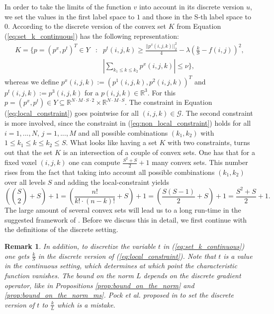 \documentclass[abstracton]{scrreprt}
\newtheorem{remark}[theorem]{Remark}
\begin{document}
        In order to take the limits of the function $v$ into account in its discrete version $u$, we set the values in the first label space to $1$ and those in the S-th label space to $0$. According to \cite{Pock-et-al-iccv09} the discrete version of the convex set $K$ from Equation (\ref{eq:set_k_continuous}) has the following representation:
            \begin{eqnarray}
                K = \{ p = (p^{x}, p^{t})^{T} \in Y &:& p^{t}(i,j,k) \ge \frac{||p^{x}(i,j,k)||_{2}^{2}}{4} - \lambda(\frac{k}{S} - f(i,j))^{2}, \label{eq:local_constraint} \\
                &&\left| \sum_{k_{1} \le k \le k_{2}} p^{x}(i,j,k) \right| \le \nu \}, \label{eq:non_local_constraint}
            \end{eqnarray}
        whereas we define $p^{x}(i,j,k) := (p^{1}(i,j,k), p^{2}(i,j,k))^{T}$ and $p^{t}(i,j,k) := p^{3}(i,j,k)$ for a $p(i,j,k) \in \mathbb{R}^{3}$. For this $p = (p^{x}, p^{t}) \in Y \subseteq \mathbb{R}^{N \cdot M \cdot S \cdot 2} \times \mathbb{R}^{N \cdot M \cdot S}$. The constraint in Equation (\ref{eq:local_constraint}) goes pointwise for all $(i, j, k) \in \mathcal{G}$. The second constraint is more involved, since the constraint in (\ref{eq:non_local_constraint}) holds for all $i = 1, ..., N$, $j = 1, ..., M$ and all possible combinations $(k_{1}, k_{2})$ with $1 \le k_{1} \le k \le k_{2} \le S$. What looks like having a set $K$ with two constraints, turns out that the set $K$ is an intersection of a couple of convex sets. One has that for a fixed voxel $(i, j, k)$ one can compute $\frac{S^{2} + S}{2} + 1$ many convex sets. This number rises from the fact that taking into account all possible combinations $(k_{1}, k_{2})$ over all levels $S$ and adding the local-constraint yields
            $$
                \left(\binom{S}{2} + S\right) + 1 = \left(\frac{n!}{k! \cdot (n-k)!} + S\right) + 1 = \left(\frac{S(S-1)}{2} + S\right) + 1 = \frac{S^{2} + S}{2} + 1.
            $$
        The large amount of several convex sets will lead us to a long run-time in the suggested framework of \cite{Pock-et-al-iccv09}. Before we discuss this in detail, we first continue with the definitions of the discrete setting.
        \begin{remark}
            In addition, to discretize the variable $t$ in (\ref{eq:set_k_continuous}) one gets $\frac{k}{S}$ in the discrete version of (\ref{eq:local_constraint}). Note that $t$ is a value in the continuous setting, which determines at which point the characteristic function vanishes. The bound on the norm $L$ depends on the discrete gradient operator, like in Propositions \ref{prop:bound_on_the_norm} and \ref{prop:bound_on_the_norm_ms}. Pock et al. proposed in \cite{Pock-et-al-iccv09} to set the discrete version of $t$ to $\frac{k}{L}$ which is a mistake.
        \end{remark}
\end{document}

